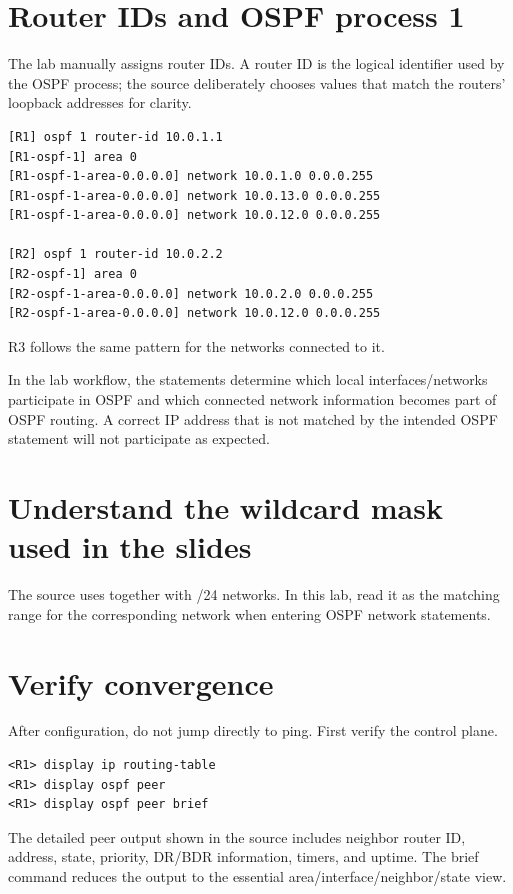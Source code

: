 \section{Router IDs and OSPF process 1}
The lab manually assigns router IDs. A router ID is the logical identifier used by the OSPF process; the source deliberately chooses values that match the routers' loopback addresses for clarity.

\begin{lstlisting}[style=dcnterminal]
[R1] ospf 1 router-id 10.0.1.1
[R1-ospf-1] area 0
[R1-ospf-1-area-0.0.0.0] network 10.0.1.0 0.0.0.255
[R1-ospf-1-area-0.0.0.0] network 10.0.13.0 0.0.0.255
[R1-ospf-1-area-0.0.0.0] network 10.0.12.0 0.0.0.255

[R2] ospf 1 router-id 10.0.2.2
[R2-ospf-1] area 0
[R2-ospf-1-area-0.0.0.0] network 10.0.2.0 0.0.0.255
[R2-ospf-1-area-0.0.0.0] network 10.0.12.0 0.0.0.255
\end{lstlisting}
R3 follows the same pattern for the networks connected to it.

\begin{keyidea}
In the lab workflow, the  statements determine which local interfaces/networks participate in OSPF and which connected network information becomes part of OSPF routing. A correct IP address that is not matched by the intended OSPF statement will not participate as expected.
\end{keyidea}

\section{Understand the wildcard mask used in the slides}
The source uses  together with /24 networks. In this lab, read it as the matching range for the corresponding  network when entering OSPF network statements.

\section{Verify convergence}
After configuration, do not jump directly to ping. First verify the control plane.
\begin{lstlisting}[style=dcnterminal]
<R1> display ip routing-table
<R1> display ospf peer
<R1> display ospf peer brief
\end{lstlisting}
The detailed peer output shown in the source includes neighbor router ID, address, state, priority, DR/BDR information, timers, and uptime. The brief command reduces the output to the essential area/interface/neighbor/state view.

